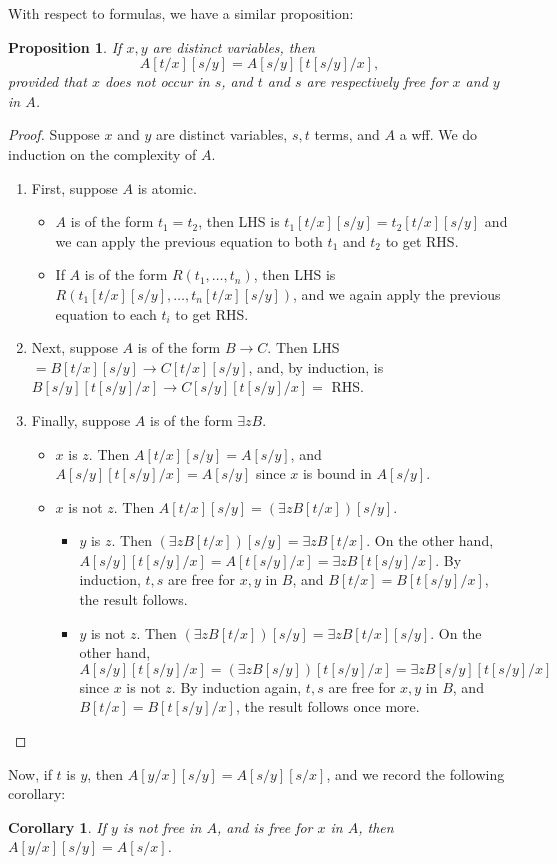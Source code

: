\documentclass[12pt]{article}
\newtheorem{prop}{Proposition}
\newtheorem{cor}{Corollary}
\begin{document}
With respect to formulas, we have a similar proposition:
\begin{prop} If $x,y$ are distinct variables, then $$A[t/x][s/y]=A[s/y][t[s/y]/x],$$ provided that $x$ does not occur in $s$, and $t$ and $s$ are respectively free for $x$ and $y$ in $A$. \end{prop}
\begin{proof} Suppose $x$ and $y$ are distinct variables, $s,t$ terms, and $A$ a wff.  We do induction on the complexity of $A$.
\begin{enumerate}
\item First, suppose $A$ is atomic.
\begin{itemize}
\item $A$ is of the form $t_1 = t_2$, then LHS is $t_1[t/x][s/y]=t_2[t/x][s/y]$ and we can apply the previous equation to both $t_1$ and $t_2$ to get RHS.  
\item If $A$ is of the form $R(t_1,\ldots,t_n)$, then LHS is $R(t_1[t/x][s/y],\ldots, t_n[t/x][s/y])$, and we again apply the previous equation to each $t_i$ to get RHS.  
\end{itemize}
\item Next, suppose $A$ is of the form $B\to C$.  Then LHS $=B[t/x][s/y] \to C[t/x][s/y]$, and, by induction, is $B[s/y][t[s/y]/x] \to C[s/y][t[s/y]/x] = $ RHS.  
\item Finally, suppose $A$ is of the form $\exists z B$.
\begin{itemize}
\item $x$ is $z$.  Then $A[t/x][s/y]=A[s/y]$, and $A[s/y][t[s/y]/x]=A[s/y]$ since $x$ is bound in $A[s/y]$.
\item $x$ is not $z$.  Then $A[t/x][s/y]=(\exists z B[t/x])[s/y]$.
\begin{itemize}
\item $y$ is $z$.  Then $(\exists z B[t/x])[s/y] = \exists z B[t/x]$.  On the other hand, $A[s/y][t[s/y]/x] = A[t[s/y]/x] = \exists z B[t[s/y]/x]$.  By induction, $t,s$ are free for $x,y$ in $B$, and $B[t/x]=B[t[s/y]/x]$, the result follows.
\item $y$ is not $z$.  Then $(\exists z B[t/x])[s/y] = \exists z B[t/x][s/y]$.  On the other hand, $A[s/y][t[s/y]/x] = (\exists z B[s/y])[t[s/y]/x] = \exists z B[s/y][t[s/y]/x]$ since $x$ is not $z$.  By induction again, $t,s$ are free for $x,y$ in $B$, and $B[t/x]=B[t[s/y]/x]$, the result follows once more.
\end{itemize}
\end{itemize}
\end{enumerate}
\end{proof}
Now, if $t$ is $y$, then $A[y/x][s/y]=A[s/y][s/x]$, and we record the following corollary:
\begin{cor} If $y$ is not free in $A$, and is free for $x$ in $A$, then $A[y/x][s/y]=A[s/x]$. \end{cor}

\end{document}
